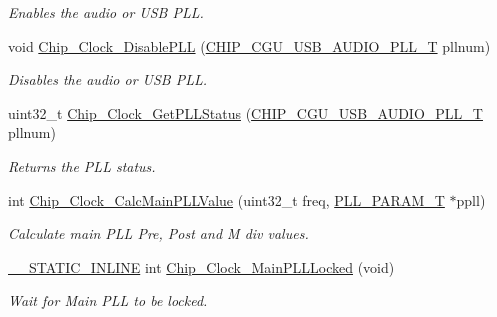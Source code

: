 \begin{DoxyCompactItemize}
\begin{DoxyCompactList}\small\item\em Enables the audio or U\+SB P\+LL. \end{DoxyCompactList}\item 
void \hyperlink{group___c_l_o_c_k__18_x_x__43_x_x_gaa9ce1d7461c0eeca2fe5b72528d9d81e}{Chip\+\_\+\+Clock\+\_\+\+Disable\+P\+LL} (\hyperlink{group___c_l_o_c_k__18_x_x__43_x_x_ga839a458a9e1e2a85e68470156c861e6a}{C\+H\+I\+P\+\_\+\+C\+G\+U\+\_\+\+U\+S\+B\+\_\+\+A\+U\+D\+I\+O\+\_\+\+P\+L\+L\+\_\+T} pllnum)
\begin{DoxyCompactList}\small\item\em Disables the audio or U\+SB P\+LL. \end{DoxyCompactList}\item 
uint32\+\_\+t \hyperlink{group___c_l_o_c_k__18_x_x__43_x_x_gad2a40b92ab5d064cc655ae4ada1474b0}{Chip\+\_\+\+Clock\+\_\+\+Get\+P\+L\+L\+Status} (\hyperlink{group___c_l_o_c_k__18_x_x__43_x_x_ga839a458a9e1e2a85e68470156c861e6a}{C\+H\+I\+P\+\_\+\+C\+G\+U\+\_\+\+U\+S\+B\+\_\+\+A\+U\+D\+I\+O\+\_\+\+P\+L\+L\+\_\+T} pllnum)
\begin{DoxyCompactList}\small\item\em Returns the P\+LL status. \end{DoxyCompactList}\item 
int \hyperlink{group___c_l_o_c_k__18_x_x__43_x_x_ga1412ab2c1437f42f77ef96f321a0055b}{Chip\+\_\+\+Clock\+\_\+\+Calc\+Main\+P\+L\+L\+Value} (uint32\+\_\+t freq, \hyperlink{struct_p_l_l___p_a_r_a_m___t}{P\+L\+L\+\_\+\+P\+A\+R\+A\+M\+\_\+T} $\ast$ppll)
\begin{DoxyCompactList}\small\item\em Calculate main P\+LL Pre, Post and M div values. \end{DoxyCompactList}\item 
\hyperlink{cmsis__iccarm_8h_aba87361bfad2ae52cfe2f40c1a1dbf9c}{\+\_\+\+\_\+\+S\+T\+A\+T\+I\+C\+\_\+\+I\+N\+L\+I\+NE} int \hyperlink{group___c_l_o_c_k__18_x_x__43_x_x_gae553f4ede5f7ac8401c16e9df9e37102}{Chip\+\_\+\+Clock\+\_\+\+Main\+P\+L\+L\+Locked} (void)
\begin{DoxyCompactList}\small\item\em Wait for Main P\+LL to be locked. \end{DoxyCompactList}\end{DoxyCompactItemize}

